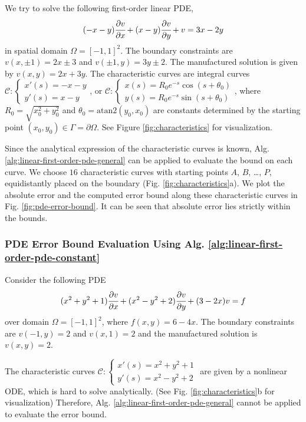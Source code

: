 \documentclass{uai2023}
\newcommand{\px}[1]{\cfrac{\partial #1}{\partial x}}
\newcommand{\py}[1]{\cfrac{\partial #1}{\partial y}}
\begin{document}
    We try to solve the following first-order linear PDE,
    {
        \small
        \begin{equation} \label{eq:attractor}
            (-x -y) \px{v} + (x - y) \py{v} + v = 3x - 2 y
        \end{equation}
    }
    in spatial domain $\Omega=[-1, 1]^2$. 
    The boundary constraints are $v(x, \pm1) =2x\pm 3$ and $v(\pm 1, y) = 3y \pm 2$. 
    The manufactured solution is given by $v(x, y) = 2x + 3y$.
    The characteristic curves are integral curves {\small $\mathcal{C}: \begin{cases*} x'(s) = -x - y \\[-0.25em] y'(s) = x - y \end{cases*}$}, or {\small $\mathcal{C}:\begin{cases*} x(s) = R_0 e^{-s} \cos (s+\theta_0)\\[-0.25em] y(s) = R_0 e^{-s} \sin(s + \theta_0) \end{cases*}$}, where $R_0 = \sqrt{x_0^2+y_0^2}$ and $\theta_0 = \mathrm{atan2}(y_0, x_0)$ are constants determined by the starting point $(x_0, y_0) \in \Gamma = \partial \Omega$.
    See Figure \ref{fig:characteristics} for visualization.

    Since the analytical expression of the characteristic curves is known, Alg. \ref{alg:linear-first-order-pde-general} can be applied to evaluate the bound on each curve. 
    We choose $16$ characteristic curves with starting points $A$, $B$, \dots, $P$, equidistantly placed on the boundary (Fig. \ref{fig:characteristics}a). 
    We plot the absolute error and the computed error bound along these characteristic curves in Fig. \ref{fig:pde-error-bound}.
    It can be seen that absolute error lies strictly within the bounds.
\subsubsection{PDE Error Bound Evaluation Using Alg. \ref{alg:linear-first-order-pde-constant}}
    Consider the following PDE 
    {
        \small
        \begin{equation}\label{eq:hard-to-solve-characteristics}
            (x^2+y^2+1)\px{v} + (x^2-y^2+2)\py{v} + (3-2x)v = f
        \end{equation}
    }
    over domain $\Omega = [-1, 1]^2$, where $f(x, y) = 6-4x$.
    The boundary constraints are $v(-1, y) = 2$ and $v(x, 1) = 2$ and the manufactured solution is $v(x, y) = 2$.
    
    The characteristic curves {\small $\mathcal{C}: \begin{cases*} x'(s) = x^2+y^2+1 \\[-0.25em] y'(s) = x^2 - y^2 + 2 \end{cases*}$} are given by a nonlinear ODE, which is hard to solve analytically. 
    (See Fig. \ref{fig:characteristics}b for visualization)
    Therefore, Alg. \ref{alg:linear-first-order-pde-general} cannot be applied to evaluate the error bound. 
\end{document}
